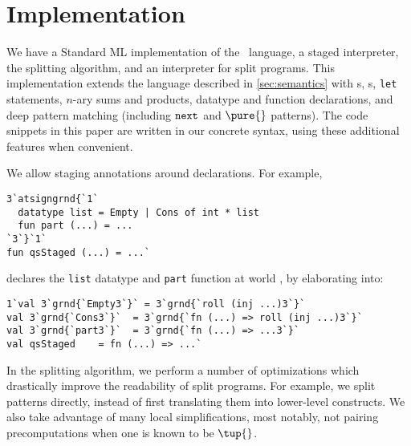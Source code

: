 
\section {Implementation}
\label{sec:implementation}

\begin{abstrsyn}
We have a Standard ML implementation of the \lang\ language, a staged
interpreter, the splitting algorithm, and an interpreter for split programs.
This implementation extends the language described in \ref{sec:semantics} with 
\rmint{}s,
\rmbool{}s,
\texttt{let} statements,
$n$-ary sums and products,
datatype and function declarations, and
deep pattern matching (including ${\tt next}{}$ and $\pure{}$ patterns).
The code snippets in this paper are written in our concrete syntax, using 
these additional features when convenient.

We allow staging annotations around declarations. For example,
\begin{lstlisting}
3`atsigngrnd{`1`
  datatype list = Empty | Cons of int * list
  fun part (...) = ...
`3`}`1`
fun qsStaged (...) = ...`
\end{lstlisting}
declares the \texttt{list} datatype and \texttt{part} function at world \bbonep,
by elaborating into:
\begin{lstlisting}
1`val 3`grnd{`Empty3`}` = 3`grnd{`roll (inj ...)3`}`
val 3`grnd{`Cons3`}`  = 3`grnd{`fn (...) => roll (inj ...)3`}`
val 3`grnd{`part3`}`  = 3`grnd{`fn (...) => ...3`}`
val qsStaged    = fn (...) => ...`
\end{lstlisting}

In the splitting algorithm, we perform a number of optimizations which
drastically improve the readability of split programs. For example, we split
patterns directly, instead of first translating them into lower-level
constructs. We also take advantage of many local simplifications, most notably,
not pairing precomputations when one is known to be $\tup{}$.




\end{abstrsyn}
